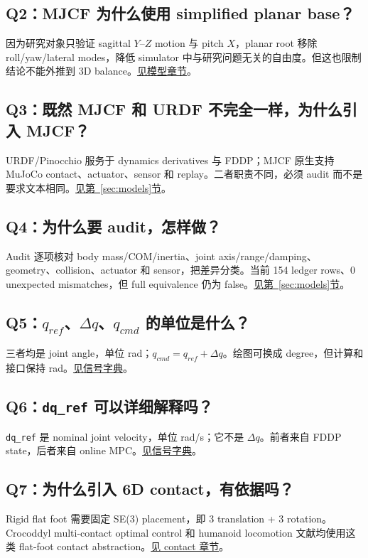 \documentclass[UTF8,11pt,a4paper]{ctexart}
\newcommand{\code}[1]{\texttt{#1}}
\begin{document}
\subsection{Q2：MJCF 为什么使用 simplified planar base？}\label{q2}
因为研究对象只验证 sagittal $Y$--$Z$ motion 与 pitch $X$，planar root 移除 roll/yaw/lateral modes，降低 simulator 中与研究问题无关的自由度。但这也限制结论不能外推到 3D balance。\hyperref[sec:models]{见模型章节}。

\subsection{Q3：既然 MJCF 和 URDF 不完全一样，为什么引入 MJCF？}\label{q3}
URDF/Pinocchio 服务于 dynamics derivatives 与 FDDP；MJCF 原生支持 MuJoCo contact、actuator、sensor 和 replay。二者职责不同，必须 audit 而不是要求文本相同。\hyperref[sec:models]{见第~\ref*{sec:models}节}。

\subsection{Q4：为什么要 audit，怎样做？}\label{q4}
Audit 逐项核对 body mass/COM/inertia、joint axis/range/damping、geometry、collision、actuator 和 sensor，把差异分类。当前 154 ledger rows、0 unexpected mismatches，但 full equivalence 仍为 false。\hyperref[sec:models]{见第~\ref*{sec:models}节}。

\subsection{Q5：$q_{ref}$、$\Delta q$、$q_{cmd}$ 的单位是什么？}\label{q5}
三者均是 joint angle，单位 rad；$q_{cmd}=q_{ref}+\Delta q$。绘图可换成 degree，但计算和接口保持 rad。\hyperref[sec:signals]{见信号字典}。

\subsection{Q6：\code{dq\_ref} 可以详细解释吗？}\label{q6}
\code{dq\_ref} 是 nominal joint velocity，单位 rad/s；它不是 $\Delta q$。前者来自 FDDP state，后者来自 online MPC。\hyperref[sec:signals]{见信号字典}。

\subsection{Q7：为什么引入 6D contact，有依据吗？}\label{q7}
Rigid flat foot 需要固定 SE(3) placement，即 3 translation + 3 rotation。Crocoddyl multi-contact optimal control 和 humanoid locomotion 文献均使用这类 flat-foot contact abstraction\cite{mastalli2020crocoddyl,kuindersma2016optimization}。\hyperref[sec:contact]{见 contact 章节}。
\end{document}
